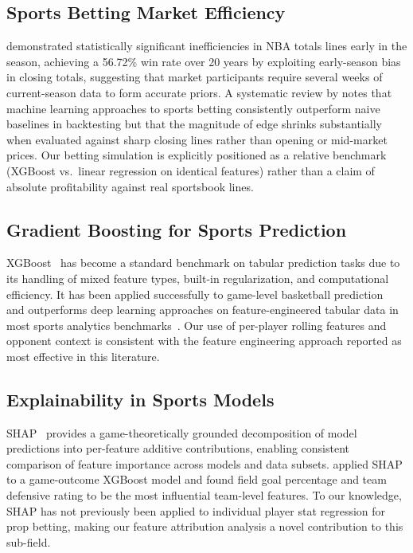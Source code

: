 \documentclass[12pt, letterpaper]{article}
\begin{document}
\subsection{Sports Betting Market Efficiency}

\citet{baryla2007learning} demonstrated statistically significant
inefficiencies in NBA totals lines early in the season, achieving a
56.72\% win rate over 20 years by exploiting early-season bias in
closing totals, suggesting that market participants require several weeks
of current-season data to form accurate priors.
A systematic review by \citet{galekwa2024systematic} notes that
machine learning approaches to sports betting consistently outperform
naive baselines in backtesting but that the magnitude of edge shrinks
substantially when evaluated against sharp closing lines rather than
opening or mid-market prices.
Our betting simulation is explicitly positioned as a relative benchmark
(XGBoost vs.\ linear regression on identical features) rather than a
claim of absolute profitability against real sportsbook lines.

\subsection{Gradient Boosting for Sports Prediction}

XGBoost~\citep{chen2016xgboost} has become a standard benchmark on
tabular prediction tasks due to its handling of mixed feature types,
built-in regularization, and computational efficiency.
It has been applied successfully to game-level basketball
prediction~\citep{chen2021hybrid,ouyang2024xgboost} and outperforms
deep learning approaches on feature-engineered tabular data in
most sports analytics benchmarks~\citep{plosone2025systematic}.
Our use of per-player rolling features and opponent context is
consistent with the feature engineering approach reported as most
effective in this literature.

\subsection{Explainability in Sports Models}

SHAP~\citep{lundberg2017unified} provides a game-theoretically grounded
decomposition of model predictions into per-feature additive contributions,
enabling consistent comparison of feature importance across models and
data subsets.
\citet{ouyang2024xgboost} applied SHAP to a game-outcome XGBoost model
and found field goal percentage and team defensive rating to be the most
influential team-level features.
To our knowledge, SHAP has not previously been applied to individual
player stat regression for prop betting, making our feature attribution
analysis a novel contribution to this sub-field.
\end{document}
